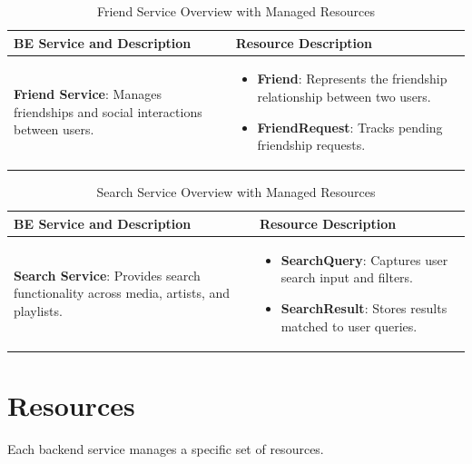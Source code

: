 \documentclass[a4paper,12pt]{article}
\begin{document}
\begin{table}[H]
    \centering
    \renewcommand{\arraystretch}{1.5}
    \begin{tabular}{|>{\centering\arraybackslash}m{4cm}|m{10cm}|}
    \hline
    \textbf{BE Service and Description} & \textbf{Resource Description} \\
    \hline
    \textbf{Friend Service}: Manages friendships and social interactions between users. & 
    \begin{itemize}[left=0pt]
        \item \textbf{Friend}: Represents the friendship relationship between two users.
        \item \textbf{FriendRequest}: Tracks pending friendship requests.
    \end{itemize} \\
    \hline
    \end{tabular}
    \caption{Friend Service Overview with Managed Resources}
\end{table}

\begin{table}[H]
    \centering
    \renewcommand{\arraystretch}{1.5}
    \begin{tabular}{|>{\centering\arraybackslash}m{4cm}|m{10cm}|}
    \hline
    \textbf{BE Service and Description} & \textbf{Resource Description} \\
    \hline
    \textbf{Search Service}: Provides search functionality across media, artists, and playlists. & 
    \begin{itemize}[left=0pt]
        \item \textbf{SearchQuery}: Captures user search input and filters.
        \item \textbf{SearchResult}: Stores results matched to user queries.
    \end{itemize} \\
    \hline
    \end{tabular}
    \caption{Search Service Overview with Managed Resources}
\end{table}

\clearpage %

\section{Resources}
Each backend service manages a specific set of resources. 
\end{document}
